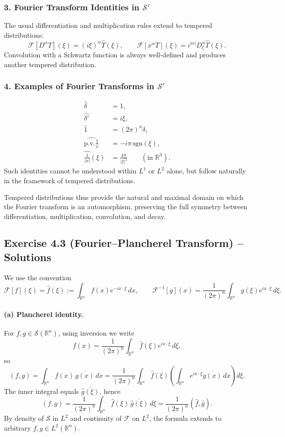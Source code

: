 \documentclass[12pt,a4paper]{article}
\theoremstyle{plain}
\theoremstyle{definition}
\theoremstyle{remark}
\theoremstyle{remark}
\begin{document}
\subsubsection*{3. Fourier Transform Identities in $\mathcal{S}'$}
The usual differentiation and multiplication rules extend to tempered
distributions:
\[
\mathcal{F}[D^\alpha T](\xi)
= (i\xi)^\alpha \widehat{T}(\xi),
\qquad
\mathcal{F}[x^\alpha T](\xi)
= i^{|\alpha|} D^\alpha_{\xi}\widehat{T}(\xi).
\]
Convolution with a Schwartz function is always well-defined and produces
another tempered distribution.

\subsubsection*{4. Examples of Fourier Transforms in $\mathcal{S}'$}
\begin{align*}
	\widehat{\delta} &= 1, \\
	\widehat{\delta'} &= i\xi, \\
	\widehat{1} &= (2\pi)^n \delta, \\
	\widehat{\mathrm{p.v.}\tfrac1x} &= -i\pi\,\mathrm{sgn}(\xi), \\
	\widehat{\tfrac1{|x|}}(\xi) &= \frac{4\pi}{|\xi|^2} 
	\qquad (\text{in }\mathbb{R}^3).
\end{align*}
Such identities cannot be understood within $L^1$ or $L^2$ alone, but follow
naturally in the framework of tempered distributions.

Tempered distributions thus provide the natural and maximal domain on which
the Fourier transform is an automorphism, preserving the full symmetry between
differentiation, multiplication, convolution, and decay.


\subsection*{Exercise 4.3 (Fourier--Plancherel Transform) -- Solutions}

We use the convention
\[
\mathcal{F}[f](\xi) = \widehat{f}(\xi)
:= \int_{\mathbb{R}^n} f(x)e^{-ix\cdot\xi}\,dx,
\qquad
\mathcal{F}^{-1}[g](x)
= \frac{1}{(2\pi)^n}\int_{\mathbb{R}^n} g(\xi)e^{ix\cdot\xi}\,d\xi.
\]

\paragraph{(a) Plancherel identity.}
For $f,g\in\mathcal{S}(\mathbb{R}^n)$, using inversion we write
\[
f(x) = \frac{1}{(2\pi)^n}
\int_{\mathbb{R}^n} \widehat{f}(\xi)e^{ix\cdot\xi}\,d\xi,
\]
so
\[
(f,g)
= \int_{\mathbb{R}^n} f(x)\,\overline{g(x)}\,dx
= \frac{1}{(2\pi)^n}
\int_{\mathbb{R}^n}
\widehat{f}(\xi)\left(\int_{\mathbb{R}^n} e^{ix\cdot\xi}
\overline{g(x)}\,dx\right)d\xi.
\]
The inner integral equals $\overline{\widehat{g}(\xi)}$, hence
\[
(f,g) = \frac{1}{(2\pi)^n}
\int_{\mathbb{R}^n} \widehat{f}(\xi)\,
\overline{\widehat{g}(\xi)}\,d\xi
= \frac{1}{(2\pi)^n}(\widehat{f},\widehat{g}).
\]
By density of $\mathcal{S}$ in $L^2$ and continuity of $\mathcal{F}$ on
$L^2$, the formula extends to arbitrary $f,g\in L^2(\mathbb{R}^n)$.
\end{document}
